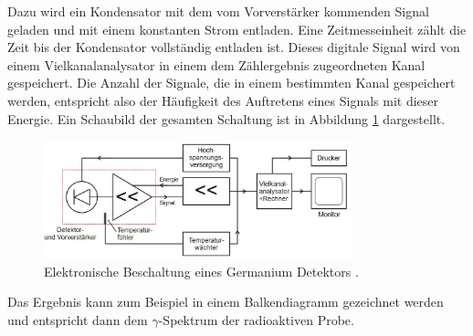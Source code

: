 Dazu wird ein Kondensator mit dem vom Vorverstärker kommenden Signal geladen und mit einem konstanten Strom entladen. 
Eine Zeitmesseinheit zählt die Zeit bis der Kondensator vollständig entladen ist.
Dieses digitale Signal wird von einem Vielkanalanalysator in einem dem Zählergebnis zugeordneten Kanal gespeichert.
Die Anzahl der Signale, die in einem bestimmten Kanal gespeichert werden, entspricht also der Häufigkeit des Auftretens eines Signals mit dieser Energie.
Ein Schaubild der gesamten Schaltung ist in Abbildung \ref{fig:t:3} dargestellt.
\begin{figure}
\centering
\includegraphics[width=0.8\textwidth]{content/skizzen/aufbau4.jpg}
\caption{Elektronische Beschaltung eines Germanium Detektors \cite{sample}.}
\label{fig:t:3}
\end{figure}
Das Ergebnis kann zum Beispiel in einem Balkendiagramm gezeichnet werden und entspricht dann dem $\gamma$-Spektrum der radioaktiven Probe.